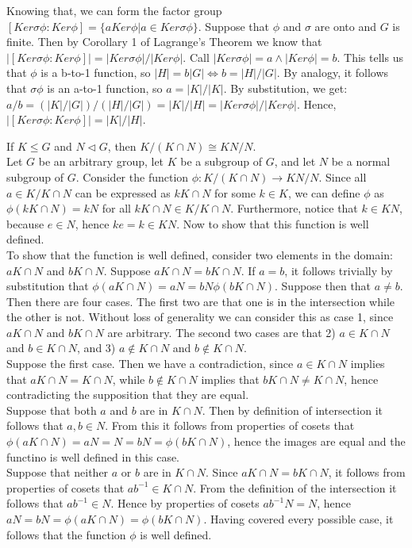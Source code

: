 \documentclass{article}
\newcommand{\and}{\wedge}
\begin{document}
Knowing that, we can form the factor group $[Ker\sigma\phi:Ker\phi]=\{a Ker\phi | a \in Ker\sigma\phi\}$. Suppose that $\phi$ and $\sigma$ are onto and $G$ is finite. Then by Corollary 1 of Lagrange's Theorem we know that $|[Ker\sigma\phi:Ker\phi]|=|Ker\sigma\phi|/|Ker\phi|$. Call $|Ker\sigma\phi|=a \and |Ker\phi|=b$. This tells us that $\phi$ is a b-to-1 function, so $|H|=b|G| \Longleftrightarrow b=|H|/|G|$. By analogy, it follows that $\sigma\phi$ is an a-to-1 function, so $a=|K|/|K|$. By substitution, we get: $a/b=(|K|/|G|)/(|H|/|G|)=|K|/|H|=|Ker\sigma\phi|/|Ker\phi|$. Hence, $|[Ker\sigma\phi:Ker\phi]|=|K|/|H|$.\\
\newpage

 If $K\le G$ and $N\lhd G$, then $K/(K\cap N)\cong KN/N.$\\

 Let $G$ be an arbitrary group, let $K$ be a subgroup of $G$, and let $N$ be a normal subgroup of $G$. Consider the function $\phi:K/(K\cap N)\rightarrow KN/N$. Since all $a\in K/K\cap N$ can be expressed as $k K\cap N$ for some $k\in K$, we can define $\phi$ as $\phi(kK\cap N) = kN$ for all $kK\cap N\in K/K\cap N$. Furthermore, notice that $k\in KN$, because $e\in N$, hence $ke = k \in KN$. Now to show that this function is well defined.\\

To show that the function is well defined, consider two elements in the domain: $aK\cap N$ and $bK\cap N$. Suppose $aK\cap N = bK\cap N$. If $a = b$, it follows trivially by substitution that $\phi(aK\cap N) = aN = bN \phi(bK\cap N)$. Suppose then that $a\ne b$. Then there are four cases. The first two are that one is in the intersection while the other is not. Without loss of generality we can consider this as case 1, since $aK\cap N$ and $bK\cap N$ are arbitrary. The second two cases are that 2) $a\in K\cap N$ and $b\in K\cap N$, and 3) $a\not \in K\cap N$ and $b\not \in K\cap N$.\\

Suppose the first case. Then we have a contradiction, since $a\in K\cap N$ implies that $aK\cap N = K\cap N$, while $b\not \in K\cap N$ implies that $bK\cap N \ne K\cap N$, hence contradicting the supposition that they are equal.\\
Suppose that both $a$ and $b$ are in $K\cap N$. Then by definition of intersection it follows that $a,b \in N$. From this it follows from properties of cosets that $\phi(aK\cap N) = aN = N = bN = \phi(bK\cap N)$, hence the images are equal and the functino is well defined in this case.\\
Suppose that neither $a$ or $b$ are in $K\cap N$. Since $aK\cap N = bK\cap N$, it follows from properties of cosets that $ab^{-1}\in K\cap N$. From the definition of the intersection it follows that $ab^{-1}\in N$. Hence by properties of cosets $ab^{-1}N = N$, hence $aN = bN = \phi(aK\cap N) = \phi(bK \cap N)$. Having covered every possible case, it follows that the function $\phi$ is well defined.\\
\end{document}
